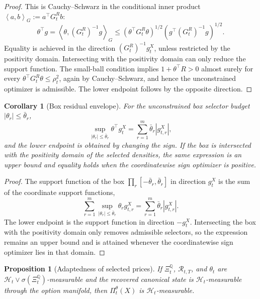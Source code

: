 \documentclass[11pt,a4paper]{amsart}
\theoremstyle{plain}
\newtheorem{proposition}[theorem]{Proposition}
\newtheorem{corollary}[theorem]{Corollary}
\theoremstyle{definition}
\theoremstyle{remark}
\newcommand{\QQ}{\mathbb{Q}}
\newcommand{\cH}{\mathcal{H}}
\newcommand{\cR}{\mathcal{R}}
\newcommand{\ip}[2]{\left\langle #1,#2\right\rangle}
\begin{document}
\begin{proof}
This is Cauchy--Schwarz in the conditional inner product
\(\ip{a}{b}_{G}:=a^\top G_t^Rb\):
\[
        \theta^\top g
        =
        \ip{\theta}{(G_t^R)^{-1}g}_{G}
        \le
        (\theta^\top G_t^R\theta)^{1/2}
        (g^\top(G_t^R)^{-1}g)^{1/2}.
\]
Equality is achieved in the direction \((G_t^R)^{-1}g_t^X\), unless restricted by the positivity
domain.  Intersecting with the positivity domain can only reduce the support function.  The
small-ball condition implies \(1+\theta^\top R>0\) almost surely for every
\(\theta^\top G_t^R\theta\le\rho_t^2\), again by Cauchy--Schwarz, and hence the unconstrained
optimizer is admissible.  The lower endpoint follows by the opposite direction.
\end{proof}

\begin{corollary}[Box residual envelope]\label{cor:box-residual-envelope}
For the unconstrained box selector budget \(|\theta_r|\le\bar\theta_r\),
\[
        \sup_{|\theta_r|\le\bar\theta_r}\theta^\top g_t^X
        =
        \sum_{r=1}^m \bar\theta_r |g_{t,r}^X|,
\]
and the lower endpoint is obtained by changing the sign.  If the box is intersected with the
positivity domain of the selected densities, the same expression is an upper bound and equality
holds when the coordinatewise sign optimizer is positive.
\end{corollary}

\begin{proof}
The support function of the box \(\prod_r[-\bar\theta_r,\bar\theta_r]\) in direction \(g_t^X\) is
the sum of the coordinate support functions,
\[
        \sum_{r=1}^m \sup_{|\theta_r|\le\bar\theta_r}\theta_rg_{t,r}^X
        =
        \sum_{r=1}^m\bar\theta_r|g_{t,r}^X|.
\]
The lower endpoint is the support function in direction \(-g_t^X\).  Intersecting the box with the
positivity domain only removes admissible selectors, so the expression remains an upper bound and
is attained whenever the coordinatewise sign optimizer lies in that domain.
\end{proof}


\begin{proposition}[Adaptedness of selected prices]\label{prop:selected-adapted}
If \(\Xi_t^\QQ\), \(\cR_{t,T}\), and \(\theta_t\) are
\(\cH_t\vee\sigma(\Xi_t^\QQ)\)-measurable and the recovered canonical state is
\(\cH_t\)-measurable through the option manifold, then \(\Pi_t^\theta(X)\) is \(\cH_t\)-measurable.
\end{proposition}
\end{document}
